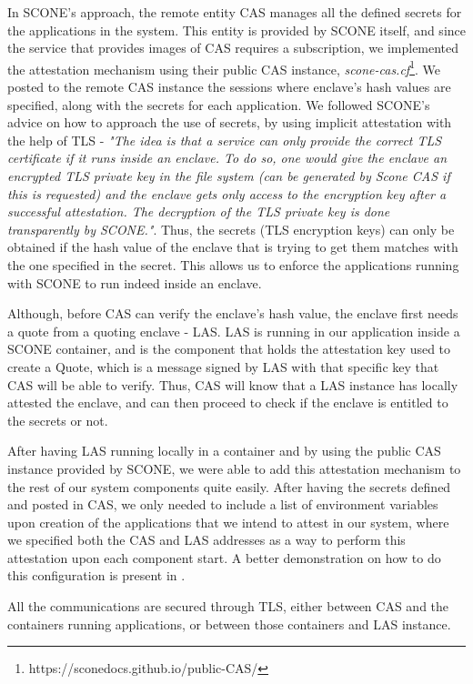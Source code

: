 In SCONE's approach, the remote entity CAS manages all the defined secrets for the applications in the system. This entity is provided by SCONE itself, and since the service that provides images of CAS requires a subscription, we implemented the attestation mechanism using their public CAS instance, \textit{scone-cas.cf}\footnote{https://sconedocs.github.io/public-CAS/}.
We posted to the remote CAS instance the sessions where enclave's hash values are specified, along with the secrets for each application. We followed SCONE's advice on how to approach the use of secrets, by using implicit attestation with the help of TLS - \textit{"The idea is that a service can only provide the correct TLS certificate if it runs inside an enclave. To do so, one would give the enclave an encrypted TLS private key in the file system (can be generated by Scone CAS if this is requested) and the enclave gets only access to the encryption key after a successful attestation. The decryption of the TLS private key is done transparently by SCONE."}.
Thus, the secrets (TLS encryption keys) can only be obtained if the hash value of the enclave that is trying to get them matches with the one specified in the secret. This allows us to enforce the applications running with SCONE to run indeed inside an enclave. 

Although, before CAS can verify the enclave's hash value, the enclave first needs a quote from a quoting enclave - LAS. LAS is running in our application inside a SCONE container, and is the component that holds the attestation key used to create a Quote, which is a message signed by LAS with that specific key that CAS will be able to verify. Thus, CAS will know that a LAS instance has locally attested the enclave, and can then proceed to check if the enclave is entitled to the secrets or not.

After having LAS running locally in a container and by using the public CAS instance provided by SCONE, we were able to add this attestation mechanism to the rest of our system components quite easily. After having the secrets defined and posted in CAS, we only needed to include a list of environment variables upon creation of the applications that we intend to attest in our system, where we specified both the CAS and LAS addresses as a way to perform this attestation upon each component start. A better demonstration on how to do this configuration is present in \cite{sconeAttestationConfig}. 

All the communications are secured through TLS, either between CAS and the containers running applications, or between those containers and LAS instance. 


